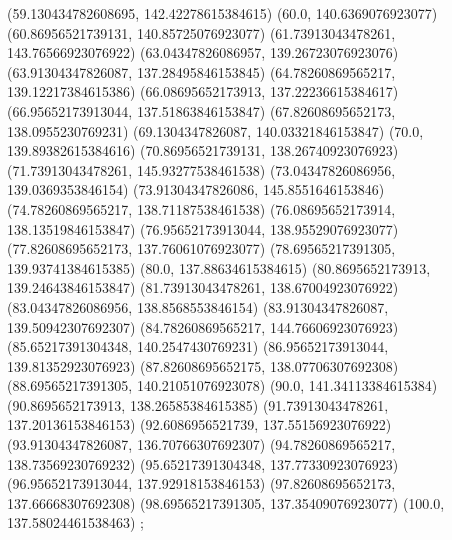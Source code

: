 {{{		(59.130434782608695, 142.42278615384615)
		(60.0, 140.6369076923077)
		(60.86956521739131, 140.85725076923077)
		(61.73913043478261, 143.76566923076922)
		(63.04347826086957, 139.26723076923076)
		(63.91304347826087, 137.28495846153845)
		(64.78260869565217, 139.12217384615386)
		(66.08695652173913, 137.22236615384617)
		(66.95652173913044, 137.51863846153847)
		(67.82608695652173, 138.0955230769231)
		(69.1304347826087, 140.03321846153847)
		(70.0, 139.89382615384616)
		(70.86956521739131, 138.26740923076923)
		(71.73913043478261, 145.93277538461538)
		(73.04347826086956, 139.0369353846154)
		(73.91304347826086, 145.8551646153846)
		(74.78260869565217, 138.71187538461538)
		(76.08695652173914, 138.13519846153847)
		(76.95652173913044, 138.95529076923077)
		(77.82608695652173, 137.76061076923077)
		(78.69565217391305, 139.93741384615385)
		(80.0, 137.88634615384615)
		(80.8695652173913, 139.24643846153847)
		(81.73913043478261, 138.67004923076922)
		(83.04347826086956, 138.8568553846154)
		(83.91304347826087, 139.50942307692307)
		(84.78260869565217, 144.76606923076923)
		(85.65217391304348, 140.2547430769231)
		(86.95652173913044, 139.81352923076923)
		(87.82608695652175, 138.07706307692308)
		(88.69565217391305, 140.21051076923078)
		(90.0, 141.34113384615384)
		(90.8695652173913, 138.26585384615385)
		(91.73913043478261, 137.20136153846153)
		(92.6086956521739, 137.55156923076922)
		(93.91304347826087, 136.70766307692307)
		(94.78260869565217, 138.73569230769232)
		(95.65217391304348, 137.77330923076923)
		(96.95652173913044, 137.92918153846153)
		(97.82608695652173, 137.66668307692308)
		(98.69565217391305, 137.35409076923077)
		(100.0, 137.58024461538463)
	};

}}
